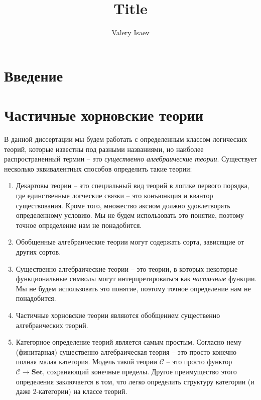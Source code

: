 \documentclass[reqno]{amsart}
\theoremstyle{definition}
\theoremstyle{remark}
\newcommand{\bcat}[1]{\mathbf{#1}}
\newcommand{\cat}[1]{\mathcal{#1}}
\newcommand{\Set}{\bcat{Set}}
\begin{document}
\title{Title}

\author{Valery Isaev}

\maketitle

\section{Введение}

\section{Частичные хорновские теории}

В данной диссертации мы будем работать с определенным классом логических теорий, которые известны под разными названиями, но наиболее распространенный термин -- это \emph{существенно алгебраические теории}.
Существует несколько эквивалентных способов определить такие теории:
\begin{enumerate}
\item Декартовы теории \cite[Definition~D1.3.4]{elephant} -- это специальный вид теорий в логике первого порядка, где единственные логческие связки -- это конъюнкция и квантор существования.
Кроме того, множество аксиом должно удовлетворять определенному условию.
Мы не будем использовать это понятие, поэтому точное определение нам не понадобится.
\item Обобщенные алгебраические теории \cite{GAT} могут содержать сорта, зависящие от других сортов.
\item Существенно алгебраические теории \cite[Definition~3.34]{LPC} -- это теории, в которых некоторые функциональные символы могут интерпретироваться как \emph{частичные} функции.
Мы не будем использовать это понятие, поэтому точное определение нам не понадобится.
\item Частичные хорновские теории \cite{PHL} являются обобщением существенно алгебраических теорий.
\item Категорное определение теорий является самым простым.
Согласно нему (финитарная) существенно алгебраическая теория -- это просто конечно полная малая категория.
Модель такой теории $\cat{C}$ -- это просто функтор $\cat{C} \to \Set$, сохраняющий конечные пределы.
Другое преимущество этого определения заключается в том, что легко определить структуру категории (и даже 2-категории) на классе теорий.
\end{enumerate}
\end{document}
